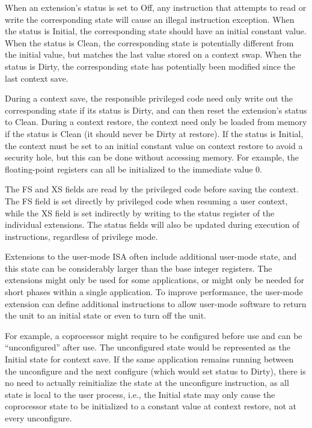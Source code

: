 When an extension's status is set to Off, any instruction that
attempts to read or write the corresponding state will cause an illegal instruction
exception.  When the status is Initial, the corresponding state should
have an initial constant value.  When the status is Clean, the
corresponding state is potentially different from the initial value,
but matches the last value stored on a context swap.  When the status
is Dirty, the corresponding state has potentially been modified since
the last context save.

During a context save, the responsible privileged code need only write
out the corresponding state if its status is Dirty, and can then reset
the extension's status to Clean.  During a context restore, the
context need only be loaded from memory if the status is Clean (it
should never be Dirty at restore).  If the status is Initial, the
context must be set to an initial constant value on context restore to
avoid a security hole, but this can be done without accessing memory.
For example, the floating-point registers can all be initialized to
the immediate value 0.

The FS and XS fields are read by the privileged code before saving the
context.  The FS field is set directly by privileged code when
resuming a user context, while the XS field is set indirectly by
writing to the status register of the individual extensions.  The
status fields will also be updated during execution of instructions,
regardless of privilege mode.

Extensions to the user-mode ISA often include additional user-mode
state, and this state can be considerably larger than the base integer
registers.  The extensions might only be used for some applications,
or might only be needed for short phases within a single application.
To improve performance, the user-mode extension can define additional
instructions to allow user-mode software to return the unit to an
initial state or even to turn off the unit.

For example, a coprocessor might require to be configured before use
and can be ``unconfigured'' after use.  The unconfigured state would
be represented as the Initial state for context save.  If the same
application remains running between the unconfigure and the next
configure (which would set status to Dirty), there is no need to
actually reinitialize the state at the unconfigure instruction, as all
state is local to the user process, i.e., the Initial state may only
cause the coprocessor state to be initialized to a constant value at
context restore, not at every unconfigure.

